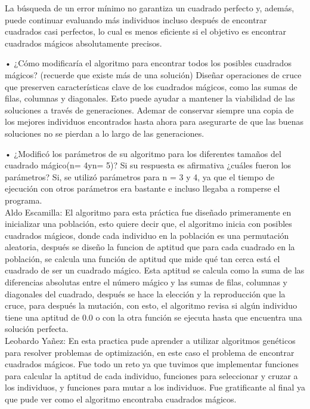 \documentclass{report}
\begin{document}
    La búsqueda de un error mínimo no garantiza un cuadrado perfecto y, además, puede continuar evaluando más individuos incluso después de encontrar cuadrados casi perfectos, lo cual es menos eficiente si el objetivo es encontrar cuadrados mágicos absolutamente precisos.

    •  ¿Cómo modificaría el algoritmo para encontrar todos los posibles cuadrados mágicos? (recuerde que existe más de una solución)
    Diseñar operaciones de cruce que preserven características clave de los cuadrados mágicos, como las sumas de filas, columnas y diagonales. Esto puede ayudar a mantener la viabilidad de las soluciones a través de generaciones.
    Ademar de conservar siempre una copia de los mejores individuos encontrados hasta ahora para asegurarte de que las buenas soluciones no se pierdan a lo largo de las generaciones.

    •  ¿Modificó  los  parámetros  de  su  algoritmo  para  los  diferentes  tamaños  del  cuadrado  mágico(n= 4yn= 5)? Si su respuesta es afirmativa ¿cuáles fueron los parámetros?
    Si, se utilizó parámetros para n = 3 y 4, ya que el tiempo de ejecución con otros parámetros era bastante e incluso llegaba a romperse el programa.\\
    
    Aldo Escamilla: El algoritmo para esta práctica fue diseñado primeramente en inicializar una población, esto quiere decir que, el algoritmo inicia con posibles cuadrados mágicos, donde cada individuo en la población es una permutación aleatoria, después se diseño la funcion de aptitud que para cada cuadrado en la población, se calcula una función de aptitud que mide qué tan cerca está el cuadrado de ser un cuadrado mágico. Esta aptitud se calcula como la suma de las diferencias absolutas entre el número mágico y las sumas de filas, columnas y diagonales del cuadrado, después se hace la elección y la reproducción que la cruce, para después la mutación, con esto, el algoritmo revisa si algún individuo tiene una aptitud de 0.0 o con la otra función se ejecuta hasta que encuentra una solución perfecta.\\

    Leobardo Yañez: En esta practica pude aprender a utilizar algoritmos genéticos para resolver problemas de optimización, en este caso el problema de encontrar cuadrados mágicos. Fue todo un reto ya que tuvimos que implementar funciones para calcular la aptitud de cada individuo, funciones para seleccionar y cruzar a los individuos, y funciones para mutar a los individuos. Fue gratificante al final ya que pude ver como el algoritmo encontraba cuadrados mágicos.\\

    
\end{document}
